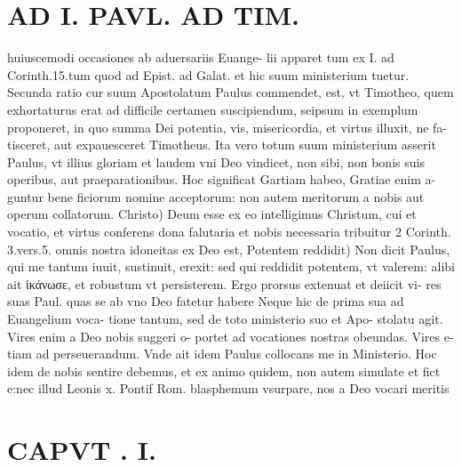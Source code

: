 \documentclass{article}
\begin{document}
\begin{pages}
\section*{AD I. PAVL. AD TIM. }
\marginpar{[ p.24 ]}\pstart huiuscemodi occasiones ab aduersariis Euange- lii apparet tum ex I. ad Corinth.15.tum quod ad Epist. ad Galat. et hic suum ministerium tuetur. Secunda ratio cur suum Apostolatum Paulus commendet, est, vt Timotheo, quem exhortaturus erat ad difficile certamen suscipiendum, seipsum in exemplum proponeret, in quo summa Dei potentia, vis, misericordia, et virtus illuxit, ne fa- tisceret, aut expauesceret Timotheus. Ita vero totum suum ministerium asserit Paulus, vt illius gloriam et laudem vni Deo vindicet, non sibi, non bonis suis operibus, aut praeparationibus. Hoc significat Gartiam habeo, Gratiae enim a- guntur bene ficiorum nomine acceptorum: non autem meritorum a nobis aut operum collatorum. Christo) Deum esse ex eo intelligimus Christum, cui et vocatio, et virtus conferens dona falutaria et nobis necessaria tribuitur 2 Corinth. 3.vers.5. omnis nostra idoneitas ex Deo est, Potentem reddidit) Non dicit Paulus, qui me tantum iuuit, sustinuit, erexit: sed qui reddidit potentem, vt valerem: alibi ait ἱκάνωσε, et robustum vt persisterem. Ergo prorsus extenuat et deiicit vi- res suas Paul. quas se ab vno Deo fatetur habere Neque hic de prima sua ad Euangelium voca- tione tantum, sed de toto ministerio suo et Apo- stolatu agit. Vires enim a Deo nobis suggeri o- portet ad vocationes nostras obeundas. Vires e- tiam ad perseuerandum. Vnde ait idem Paulus collocans me in Ministerio. Hoc idem de nobis sentire debemus, et ex animo quidem, non autem simulate et fict e:nec illud Leonis x. Pontif Rom. blasphemum vsurpare, nos a Deo vocari meritis  \pend
\section*{CAPVT . I. }
\marginpar{[ p.25 ]}\pstart {}
{}

\end{pages}
\end{document}
